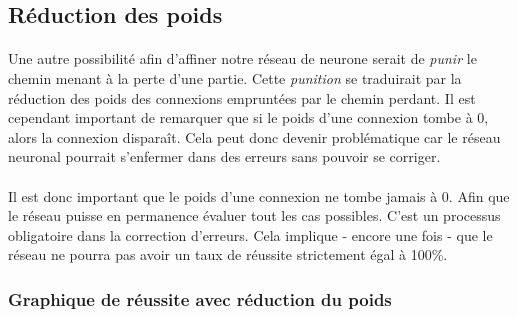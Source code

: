 \documentclass{article}
\begin{document}
  \subsection{Réduction des poids}
  \paragraph{}
    Une autre possibilité afin d’affiner notre réseau de neurone serait de \emph{punir} le chemin menant à la perte d'une partie.
    Cette \emph{punition} se traduirait par la réduction des poids des connexions empruntées par le chemin perdant.
    Il est cependant important de remarquer que si le poids d'une connexion tombe à 0, alors la connexion disparaît. Cela peut donc devenir problématique
    car le réseau neuronal pourrait s'enfermer dans des erreurs sans pouvoir se corriger.
  \paragraph{}
    Il est donc important que le poids d'une connexion ne tombe jamais à 0. Afin que le réseau puisse en permanence évaluer tout les cas
    possibles. C'est un processus obligatoire dans la correction d'erreurs. Cela implique - encore une fois - que le réseau ne pourra pas avoir un taux de
    réussite strictement égal à 100\%.
      \subsubsection{Graphique de réussite avec réduction du poids}
	\paragraph{}
	\\
  
\end{document}
